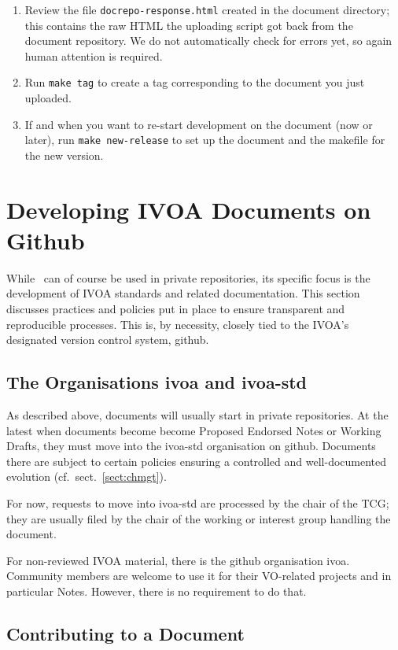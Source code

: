\documentclass[11pt,a4paper]{ivoa}
\begin{document}
\begin{enumerate}
\item Review the file \texttt{docrepo-response.html} created in the
document directory; this contains the raw HTML the uploading script got
back from the document repository.  We do not automatically check for
errors yet, so again human attention is required.

\item Run \verb|make tag| to create a tag corresponding to the document
you just uploaded.

\item If and when you want to re-start development on the document (now or
later), run \verb|make new-release| to set up the document and the
makefile for the new version.
\end{enumerate}


\section{Developing IVOA Documents on Github}
\label{sect:ivoapol}

While \ivoatex\ can of course be used in private repositories, its
specific focus is the development of IVOA standards and related
documentation.  This section discusses practices and policies put in
place to ensure transparent and reproducible processes.  This is, by
necessity, closely tied to the IVOA's designated version control system,
github.


\subsection{The Organisations ivoa and ivoa-std}

As described above, documents will usually start in private
repositories.  At the latest when documents become become Proposed
Endorsed Notes or Working Drafts, they must move into the ivoa-std
organisation on github.
Documents there are subject to certain policies ensuring
a controlled and well-documented evolution (cf.~sect.~\ref{sect:chmgt}).

For now, requests to move into ivoa-std are processed by the chair of
the TCG; they are usually filed by the chair of the working or interest
group handling the document.

For non-reviewed IVOA material, there is the github organisation ivoa.
Community members are welcome to use it for their VO-related projects
and in particular Notes.  However, there is no requirement to do that.


\subsection{Contributing to a Document}
\label{sect:contributing}
\end{document}
